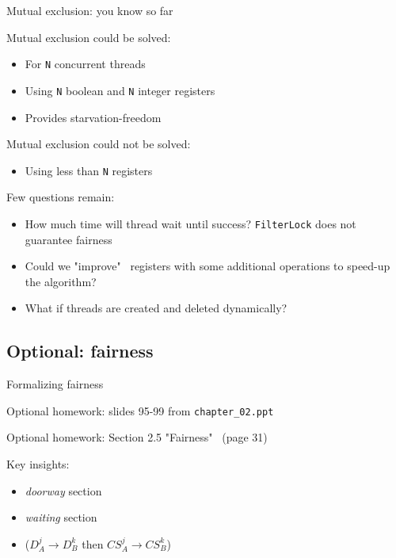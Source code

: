 \begin{frame}[fragile]{Mutual exclusion: you know so far}

Mutual exclusion could be solved:
\begin{itemize}
  \item For \texttt{N} concurrent threads
  \item Using \texttt{N} boolean and \texttt{N} integer registers
  \item Provides starvation-freedom
\end{itemize}

\pause

Mutual exclusion could not be solved:
\begin{itemize}
  \item Using less than \texttt{N} registers
\end{itemize}

\pause

Few questions remain:
\begin{itemize}
  \pause
  \item How much time will thread wait until success? \texttt{FilterLock} does not guarantee fairness

  \pause
  \item Could we "improve" \ registers with some additional operations to speed-up the algorithm?

  \pause
  \item What if threads are created and deleted dynamically?

\end{itemize}
\end{frame}

\subsection{Optional: fairness}
\showTOCSub

\begin{frame}[fragile]{Formalizing fairness}

Optional homework: slides 95-99 from \texttt{chapter\_02.ppt}

Optional homework: Section 2.5 "Fairness" \ (page 31)

Key insights: 
\begin{itemize}
  \item \textit{doorway} section
  \item \textit{waiting} section
  \item {} ($D_{A}^{j} \rightarrow D_{B}^{k}$ then $CS_{A}^{j} \rightarrow CS_{B}^{k}$)
\end{itemize}

\end{frame}


